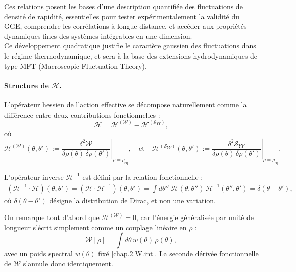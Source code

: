 \medskip

Ces relations posent les bases d'une description quantifiée des fluctuations de densité de rapidité, essentielles pour tester expérimentalement la validité du GGE, comprendre les corrélations à longue distance, et accéder aux propriétés dynamiques fines des systèmes intégrables en une dimension.\\

Ce développement quadratique justifie le caractère gaussien des fluctuations dans le régime thermodynamique, et sera à la base des extensions hydrodynamiques de type MFT (Macroscopic Fluctuation Theory).

\paragraph{Structure de \(\mathcal{H}\).}

L’opérateur hessien de l’action effective se décompose naturellement comme la différence entre deux contributions fonctionnelles :
\[
\mathcal{H} = \mathcal{H}^{(\mathcal{W})} - \mathcal{H}^{(\mathcal{S}_{YY})},
\]
où
\[
\mathcal{H}^{(\mathcal{W})}(\theta,\theta') := \left. \frac{\delta^2 \mathcal{W}}{\delta \rho(\theta)\, \delta \rho(\theta')} \right|_{\rho = \rho_{\mathrm{eq}}}, 
\quad \text{et} \quad 
\mathcal{H}^{(\mathcal{S}_{YY})}(\theta,\theta') := \left. \frac{\delta^2 \mathcal{S}_{YY}}{\delta \rho(\theta)\, \delta \rho(\theta')} \right|_{\rho = \rho_{\mathrm{eq}}}.
\]

L’opérateur inverse \(\mathcal{H}^{-1}\) est défini par la relation fonctionnelle :
\begin{eqnarray}
	(\mathcal{H}^{-1} \cdot \mathcal{H})(\theta, \theta') = (\mathcal{H} \cdot \mathcal{H}^{-1})(\theta, \theta') = \int d\theta'' \; \mathcal{H}(\theta, \theta'')\, \mathcal{H}^{-1}(\theta'', \theta') = \delta(\theta - \theta'),
	\label{chap:fluctu:eq:hessienner.prod.inv} 	
\end{eqnarray}
où \(\delta(\theta - \theta')\) désigne la distribution de Dirac, et non une variation.

\medskip

On remarque tout d’abord que \(\mathcal{H}^{(\mathcal{W})} = 0\), car l’énergie généralisée par unité de longueur s’écrit simplement comme un couplage linéaire en \(\rho\) :
\[
\mathcal{W}[\rho] = \int d\theta \, w(\theta)\, \rho(\theta),
\]
avec un poids spectral \(w(\theta)\) fixé \eqref{chap.2.W.int}. La seconde dérivée fonctionnelle de \(\mathcal{W}\) s’annule donc identiquement.

